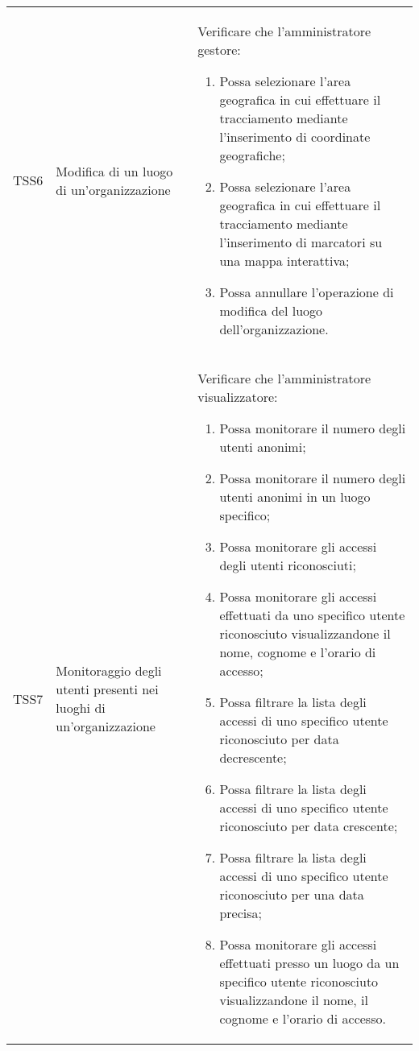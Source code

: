 {\begin{longtable}{ c  C{3cm}  C{11cm} }
TSS6 & Modifica di un luogo di un'organizzazione & 
Verificare che l'amministratore gestore:
\begin{enumerate}
    \item Possa selezionare l'area geografica in cui effettuare il tracciamento mediante l'inserimento di coordinate geografiche;
    \item Possa selezionare l'area geografica in cui effettuare il tracciamento mediante l'inserimento di marcatori su una mappa interattiva;
    \item Possa annullare l'operazione di modifica del luogo dell'organizzazione.
\end{enumerate} \\

TSS7 & Monitoraggio degli utenti presenti nei luoghi di un'organizzazione &
Verificare che l'amministratore visualizzatore:
\begin{enumerate}
    \item Possa monitorare il numero degli utenti anonimi;
    \item Possa monitorare il numero degli utenti anonimi in un luogo specifico;
    \item Possa monitorare gli accessi degli utenti riconosciuti;
    \item Possa monitorare gli accessi effettuati da uno specifico utente riconosciuto visualizzandone il nome, cognome e l'orario di accesso;
    \item Possa filtrare la lista degli accessi di uno specifico utente riconosciuto per data decrescente;
    \item Possa filtrare la lista degli accessi di uno specifico utente riconosciuto per data crescente;
    \item Possa filtrare la lista degli accessi di uno specifico utente riconosciuto per una data precisa;
    \item Possa monitorare gli accessi effettuati presso un luogo da un specifico utente riconosciuto visualizzandone il nome, il cognome e l’orario di accesso.
\end{enumerate} \\


\end{longtable}}
